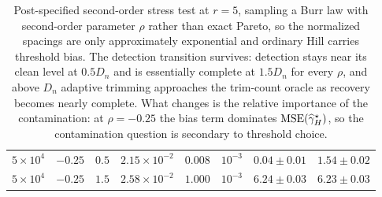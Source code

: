 \begin{table}[H]
\begin{tabular}{cccccccc}
$5{\times}10^4$ & $-0.25$ & $0.5$ & $2.15{\times}10^{-2}$ & $0.008$ & $10^{-3}$ & $0.04\pm0.01$ & $1.54\pm0.02$\\
$5{\times}10^4$ & $-0.25$ & $1.5$ & $2.58{\times}10^{-2}$ & $1.000$ & $10^{-3}$ & $6.24\pm0.03$ & $6.23\pm0.03$\\
\bottomrule
\end{tabular}
\caption{Post-specified second-order stress test at $r=5$, sampling a Burr law with second-order parameter $\rho$ rather than exact Pareto, so the normalized spacings are only approximately exponential and ordinary Hill carries threshold bias.  The detection transition survives: detection stays near its clean level at $0.5D_n$ and is essentially complete at $1.5D_n$ for every $\rho$, and above $D_n$ adaptive trimming approaches the trim-count oracle as recovery becomes nearly complete.  What changes is the relative importance of the contamination: at $\rho=-0.25$ the bias term dominates $\operatorname{MSE}(\widehat{\gamma}_H^\star)$, so the contamination question is secondary to threshold choice.}
\label{tab:stress-second-order}
\end{table}
